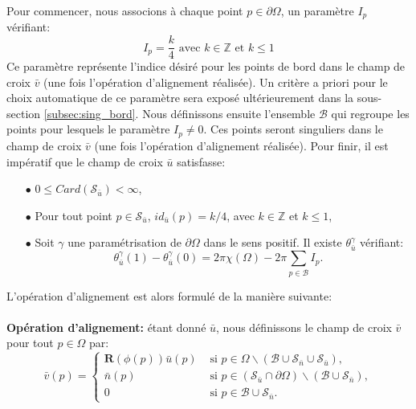 Pour commencer, nous associons à chaque point $p\in\partial\Omega$, un paramètre $I_p$ vérifiant:
\begin{equation}
I_p=\displaystyle\frac{k}{4}\mbox{ avec }k\in\mathbb{Z}\mbox{ et }k\leq 1
\end{equation}
Ce paramètre représente l'indice désiré pour les points de bord dans le champ de croix $\bar{v}$ (une fois l'opération d'alignement réalisée). Un critère a priori pour le choix automatique de ce paramètre sera exposé ultérieurement dans la sous-section \ref{subsec:sing_bord}. Nous définissons ensuite l'ensemble $\mathcal{B}$ qui regroupe les points pour lesquels le paramètre $I_p\neq 0$. Ces points seront singuliers dans le champ de croix $\bar{v}$ (une fois l'opération d'alignement réalisée). %
Pour finir, il est impératif que le champ de croix $\bar{u}$ satisfasse:\\
\begin{itemize}
 \item[$\bullet$] $0\leq Card(\mathcal{S}_{\bar{u}})<\infty$,\\
 \item[$\bullet$] Pour tout point $p\in\mathcal{S}_{\bar{u}}$, $id_{\bar{u}}(p)=k/4$, avec $k\in\mathbb{Z}$ et $k\leq 1$,\\
 \item[$\bullet$] Soit $\gamma$ une paramétrisation de $\partial\Omega$ dans le sens positif. Il existe $\theta_{\bar{u}}^\gamma$ vérifiant:
 \begin{equation}
    \label{eqn:principe_hypothese_u}
    \theta_{\bar{u}}^\gamma(1)-\theta_{\bar{u}}^\gamma(0)=2\pi\chi(\Omega)-2\pi\sum_{p\in\mathcal{B}}I_p.
\end{equation}
\end{itemize}
L'opération d'alignement est alors formulé de la manière suivante:\\\\
\textbf{Opération d'alignement:} étant donné $\bar{u}$, nous définissons le champ de croix $\bar{v}$ pour tout $p\in\Omega$ par:
\begin{equation}
\bar{v}(p)=
\left\{
\begin{array}{ll}
\mathbf{R}(\phi(p))\bar{u}(p) & \mbox{ si } p\in\Omega\backslash(\mathcal{B}\cup\mathcal{S}_{\bar{n}}\cup\mathcal{S}_{\bar{u}}),\\[0.5cm]
\bar{n}(p) & \mbox{ si } p\in(\mathcal{S}_{\bar{u}}\cap\partial\Omega)\backslash(\mathcal{B}\cup\mathcal{S}_{\bar{n}}),\\[0.5cm]
0 & \mbox{ si } p\in\mathcal{B}\cup\mathcal{S}_{\bar{n}}.
\end{array}
\right.
\label{eqn:principe_def_v}
\end{equation}
